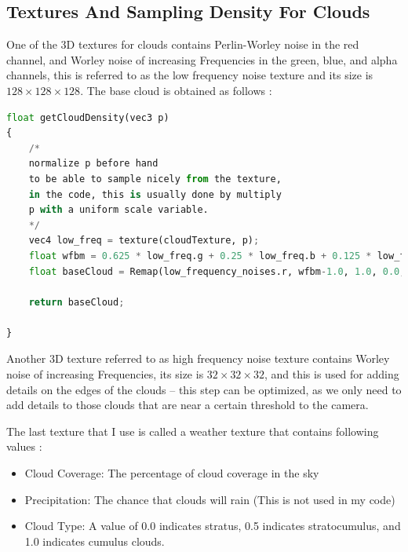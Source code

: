 \subsection{Textures And Sampling Density For Clouds}
One of the 3D textures for clouds contains Perlin-Worley noise in the red channel, and Worley noise of increasing Frequencies in the green, blue, and alpha channels, this is referred to as the low frequency noise texture and its size is $128\times128\times128$. The base cloud is obtained as follows \cite{engel2016gpupro7}:

\begin{lstlisting}[language=Python]
float getCloudDensity(vec3 p)
{
    /*
    normalize p before hand 
    to be able to sample nicely from the texture,
    in the code, this is usually done by multiply 
    p with a uniform scale variable.
    */
    vec4 low_freq = texture(cloudTexture, p);
    float wfbm = 0.625 * low_freq.g + 0.25 * low_freq.b + 0.125 * low_freq.a;
    float baseCloud = Remap(low_frequency_noises.r, wfbm-1.0, 1.0, 0.0, 1.0);

    return baseCloud;

}
\end{lstlisting}

Another 3D texture referred to as high frequency noise texture contains Worley noise of increasing Frequencies, its size is $32\times32\times32$, and this is used for adding details on the edges of the clouds -- this step can be optimized, as we only need to add details to those clouds that are near a certain threshold to the camera.

The last texture that I use is called a weather texture that contains following values \cite{engel2016gpupro7}:
\begin{itemize}
    \item Cloud Coverage: The percentage of cloud coverage in the sky
    \item Precipitation: The chance that clouds will rain (This is not used in my code)
    \item Cloud Type: A value of 0.0 indicates stratus, 0.5 indicates stratocumulus,
    and 1.0 indicates cumulus clouds. 
\end{itemize}


